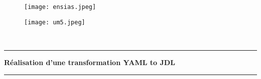 \begin{titlepage}
    \begin{center}
        \begin{figure}[!h]
            \vspace{- 2 cm}
            \hspace{ 0 cm}
            \texttt{[image: ensias.jpeg]}
        \end{figure}
        \begin{figure}[!h]
            \vspace{- 3.34cm}
            \hspace{15cm}
            \texttt{[image: um5.jpeg]}
        \end{figure}
    \end{center}

    \begin{center}
        \begin{center}
            \noindent {}\\
        \end{center}
        \begin{center}
            \rule{0.9\linewidth}{1pt}
        \end{center}
        \vspace*{0.2cm}
        \noindent \hspace{ 0.3 cm }\Huge \textbf{Réalisation d'une transformation YAML to JDL}
        \begin{center}
            \rule{0.9\linewidth}{1pt}
        \end{center}


\end{center}
\end{titlepage}
